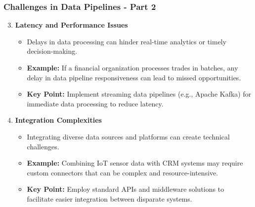 \documentclass[aspectratio=169]{beamer}
\begin{document}
\begin{frame}[fragile]
  \frametitle{Challenges in Data Pipelines - Part 2}
  \begin{enumerate}
    \setcounter{enumi}{2} %
    
    \item \textbf{Latency and Performance Issues}
      \begin{itemize}
        \item Delays in data processing can hinder real-time analytics or timely decision-making.
        \item \textbf{Example:} If a financial organization processes trades in batches, any delay in data pipeline responsiveness can lead to missed opportunities.
        \item \textbf{Key Point:} Implement streaming data pipelines (e.g., Apache Kafka) for immediate data processing to reduce latency.
      \end{itemize}
        
    \item \textbf{Integration Complexities}
      \begin{itemize}
        \item Integrating diverse data sources and platforms can create technical challenges.
        \item \textbf{Example:} Combining IoT sensor data with CRM systems may require custom connectors that can be complex and resource-intensive.
        \item \textbf{Key Point:} Employ standard APIs and middleware solutions to facilitate easier integration between disparate systems.
      \end{itemize}
  \end{enumerate}
\end{frame}
\end{document}
